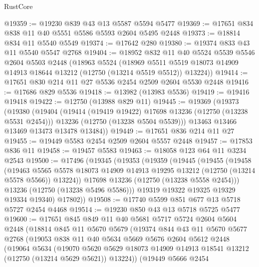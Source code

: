 \begin{lexlean}{RustCore}
\begin{coremodule}
@19359 := @19230 @839 @43 @13 @5587 @5594 @5477
@19369 := @17651 @834 @838 @11 @40 @5551 @5586 @5593 @2604 @5495 @2448
@19373 := @18814 @834 @11 @5540 @5549
@19374 := @17642 @280
@19380 := @19374 @833 @43 @11 @5540 @5547 @2768
@19404 := @18952
    @832
    @11
    @40
    @5524
    @5539
    @5546
    @2604
    @5503
    @2448
    (@18963
      @5524
      (@18969 @5511 @5519 @18073 @14909 @14913 @18644 @13212 (@12750 (@13214 @5519 @5512)) @13224))
@19414 := @17651 @830 @214 @11 @27 @5536 @2454 @2509 @2604 @5530 @2448
@19416 := @17686 @829 @5536
@19418 := @13982 (@13983 @5536)
@19419 := @19416 @19418
@19422 := @12750 (@13988 @829 @11)
@19445 := @19369
    (@19373
      (@19380
        (@19404
          (@19414 (@19419 @19422) @17698 @13236 (@12750 (@13238 @5531 @2454)))
          @13236
          (@12750 (@13238 @5504 @5539)))
        @13463
        @13466
        @13469
        @13473
        @13478
        @13484))
@19449 := @17651 @836 @214 @11 @27
@19455 := @19449 @5583 @2454 @2509 @2604 @5557 @2448
@19457 := @17853 @836 @11
@19458 := @19457 @5583
@19463 := @18058 @123 @64 @11 @3234 @2543
@19500 := @17496
    (@19345
      (@19353
        (@19359
          (@19445
            (@19455
              (@19458
                (@19463
                  @5565
                  @5578
                  @18073
                  @14909
                  @14913
                  @19295
                  @13212
                  (@12750 (@13214 @5578 @5566))
                  @13224))
              @17698
              @13236
              (@12750 (@13238 @5558 @2454)))
            @13236
            (@12750 (@13238 @5496 @5586)))
          @19319
          @19322
          @19325
          @19329
          @19334
          @19340)
        @17802))
@19508 := @17740 @5599 @851 @677 @13 @5718 @5727 @2454 @4468
@19514 := @19230 @850 @43 @13 @5718 @5725 @5477
@19600 := @17651
    @845
    @849
    @11
    @40
    @5681
    @5717
    @5724
    @2604
    @5604
    @2448
    (@18814
      @845
      @11
      @5670
      @5679
      (@19374
        @844
        @43
        @11
        @5670
        @5677
        @2768
        (@19053
          @838
          @11
          @40
          @5634
          @5669
          @5676
          @2604
          @5612
          @2448
          (@19064
            @5634
            (@19070
              @5620
              @5629
              @18073
              @14909
              @14913
              @18541
              @13212
              (@12750 (@13214 @5629 @5621))
              @13224))
          (@19449
            @5666
            @2454

\end{coremodule}
\end{lexlean}
